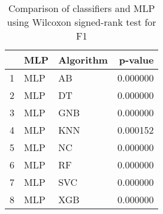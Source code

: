 \begin{table}
\footnotesize
\caption{Comparison of classifiers and MLP using Wilcoxon signed-rank test for F1}
\label{tab:MLP wilcoxon F1 comparison}
\begin{tabular}{lllr}
\hline
 & MLP & Algorithm & p-value \\
\hline
1 & MLP & AB & 0.000000 \\
2 & MLP & DT & 0.000000 \\
3 & MLP & GNB & 0.000000 \\
4 & MLP & KNN & 0.000152 \\
5 & MLP & NC & 0.000000 \\
6 & MLP & RF & 0.000000 \\
7 & MLP & SVC & 0.000000 \\
8 & MLP & XGB & 0.000000 \\
\hline
\end{tabular}
\end{table}
